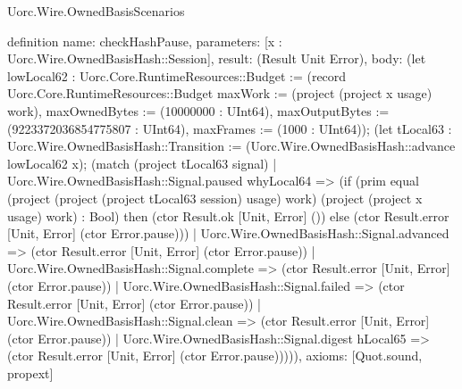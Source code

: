 \begin{lexlean}{Uorc.Wire.OwnedBasisScenarios}
\begin{semanticmodule}
definition{
  name: checkHashPause,
  parameters: [x : Uorc.Wire.OwnedBasisHash::Session],
  result: (Result Unit Error),
  body: (let lowLocal62 : Uorc.Core.RuntimeResources::Budget := (record Uorc.Core.RuntimeResources::Budget {maxWork := (project (project x usage) work), maxOwnedBytes := (10000000 : UInt64), maxOutputBytes := (9223372036854775807 : UInt64), maxFrames := (1000 : UInt64)}); (let tLocal63 : Uorc.Wire.OwnedBasisHash::Transition := (Uorc.Wire.OwnedBasisHash::advance lowLocal62 x); (match (project tLocal63 signal)
    | Uorc.Wire.OwnedBasisHash::Signal.paused whyLocal64 => (if (prim equal (project (project (project tLocal63 session) usage) work) (project (project x usage) work) : Bool) then (ctor Result.ok [Unit, Error] ()) else (ctor Result.error [Unit, Error] (ctor Error.pause)))
    | Uorc.Wire.OwnedBasisHash::Signal.advanced => (ctor Result.error [Unit, Error] (ctor Error.pause))
    | Uorc.Wire.OwnedBasisHash::Signal.complete => (ctor Result.error [Unit, Error] (ctor Error.pause))
    | Uorc.Wire.OwnedBasisHash::Signal.failed => (ctor Result.error [Unit, Error] (ctor Error.pause))
    | Uorc.Wire.OwnedBasisHash::Signal.clean => (ctor Result.error [Unit, Error] (ctor Error.pause))
    | Uorc.Wire.OwnedBasisHash::Signal.digest hLocal65 => (ctor Result.error [Unit, Error] (ctor Error.pause))))),
  axioms: [Quot.sound, propext]
}


\end{semanticmodule}
\end{lexlean}
